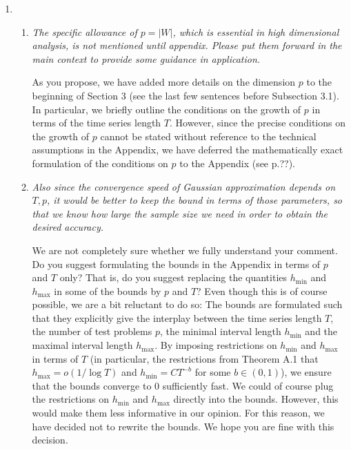 \documentclass[a4paper,12pt]{article}
\begin{document}
\begin{enumerate}[label=(\arabic*),leftmargin=0.7cm]
\item \begin{enumerate}[label=(\alph*),leftmargin=0.7cm]
\item \textit{The specific allowance of $p = |W|$, which is essential in high dimensional analysis, is not mentioned until appendix. Please put them forward in the main context to provide some guidance in application.}

As you propose, we have added more details on the dimension $p$ to the beginning of Section 3 (see the last few sentences before Subsection 3.1). In particular, we briefly outline the conditions on the growth of $p$ in terms of the time series length $T$. 
However, since the precise conditions on the growth of $p$ cannot be stated without reference to the technical assumptions in the Appendix, we have deferred the mathematically exact formulation of the conditions on $p$ to the Appendix (see p.??). 


\item \textit{Also since the convergence speed of Gaussian approximation depends on $T, p$, it would be better to keep the bound in terms of those parameters, so that we know how large the sample size we need in order to obtain the desired accuracy.}

We are not completely sure whether we fully understand your comment. Do you suggest formulating the bounds in the Appendix in terms of $p$ and $T$ only? That is, do you suggest replacing the quantities $h_{\min}$ and $h_{\max}$ in some of the bounds by $p$ and $T$? Even though this is of course possible, we are a bit reluctant to do so: The bounds are formulated such that they explicitly give the interplay between the time series length $T$, the number of test problems $p$, the minimal interval length $h_{\min}$ and the maximal interval length $h_{\max}$. By imposing restrictions on $h_{\min}$ and $h_{\max}$ in terms of $T$ (in particular, the restrictions from Theorem A.1 that $h_{\max} = o(1/\log T)$ and $h_{\min} = C T^{-b}$ for some $b \in (0,1)$), we ensure that the bounds converge to $0$ sufficiently fast. We could of course plug the restrictions on $h_{\min}$ and $h_{\max}$ directly into the bounds. However, this would make them less informative in our opinion. For this reason, we have decided not to rewrite the bounds. We hope you are fine with this decision. 
\end{enumerate}


\end{enumerate}
\end{document}
